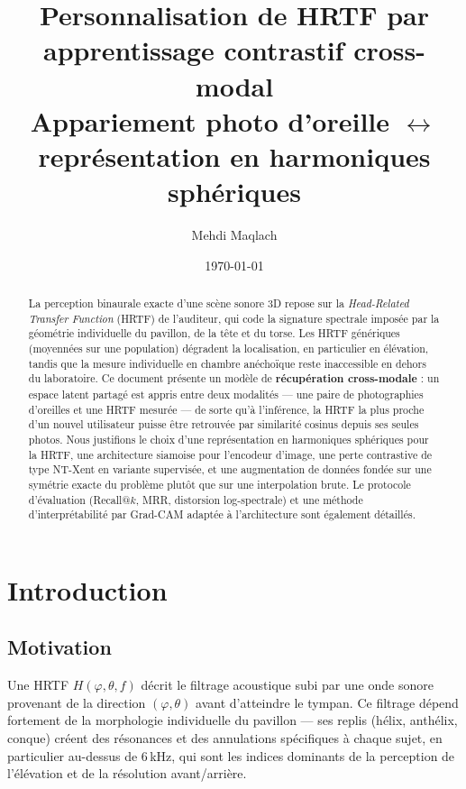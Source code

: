 \documentclass[12pt, a4paper]{article}
\title{%
    \textbf{Personnalisation de HRTF par apprentissage contrastif cross-modal}\\[0.4em]
    \large Appariement photo d'oreille $\leftrightarrow$ représentation en harmoniques sphériques
}
\author{Mehdi Maqlach}
\date{\today}
\begin{document}
\maketitle

\begin{abstract}
La perception binaurale exacte d'une scène sonore 3D repose sur la
\textit{Head-Related Transfer Function} (HRTF) de l'auditeur, qui code la
signature spectrale imposée par la géométrie individuelle du pavillon, de la
tête et du torse. Les HRTF génériques (moyennées sur une population)
dégradent la localisation, en particulier en élévation, tandis que la mesure
individuelle en chambre anéchoïque reste inaccessible en dehors du
laboratoire. Ce document présente un modèle de \textbf{récupération
cross-modale} : un espace latent partagé est appris entre deux modalités
— une paire de photographies d'oreilles et une HRTF mesurée — de sorte
qu'à l'inférence, la HRTF la plus proche d'un nouvel utilisateur puisse être
retrouvée par similarité cosinus depuis ses seules photos. Nous justifions
le choix d'une représentation en harmoniques sphériques pour la HRTF, une
architecture siamoise pour l'encodeur d'image, une perte contrastive de type
NT-Xent en variante supervisée, et une augmentation de données fondée sur
une symétrie exacte du problème plutôt que sur une interpolation brute.
Le protocole d'évaluation (Recall@$k$, MRR, distorsion log-spectrale) et une
méthode d'interprétabilité par Grad-CAM adaptée à l'architecture sont
également détaillés.
\end{abstract}

\tableofcontents
\vspace{1em}

\section{Introduction}

\subsection{Motivation}

Une HRTF $H(\varphi,\theta,f)$ décrit le filtrage acoustique subi par une
onde sonore provenant de la direction $(\varphi,\theta)$ avant d'atteindre
le tympan. Ce filtrage dépend fortement de la morphologie individuelle du
pavillon — ses replis (hélix, anthélix, conque) créent des résonances et
des annulations spécifiques à chaque sujet, en particulier au-dessus de
6\,kHz, qui sont les indices dominants de la perception de l'élévation et de
la résolution avant/arrière.
\end{document}
